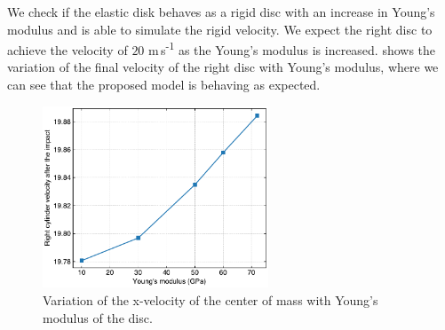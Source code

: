 We check if the elastic disk behaves as a rigid disc with an increase in
Young's modulus and is able to simulate the rigid velocity. We expect the
right disc to achieve the velocity of $20$ m\,s\textsuperscript{-1} as the
Young's modulus is increased. 
shows the variation of the final velocity of the right disc with Young's
modulus, where we can see that the proposed model is behaving as expected.
\begin{figure}[!htpb]
  \centering
  \includegraphics[width=0.6\textwidth]{figures/csph/figures/yan_2021_curved_interface/E_vs_velocity}
  \caption{Variation of the x-velocity of the center of mass with Young's
    modulus of the disc.}
\label{fig:results-yan-curved-E-vs-velocity}
\end{figure}

\FloatBarrier%
